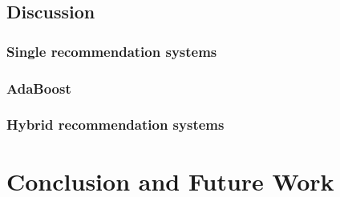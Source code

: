 \documentclass[10pt]{reportMaster}
\begin{document}
\section{Discussion}

\subsection{Single recommendation systems}


\subsection{AdaBoost}

\subsection{Hybrid recommendation systems}





\chapter{Conclusion and Future Work}









\end{document}
